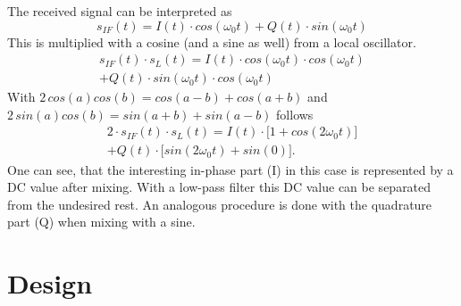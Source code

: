 \documentclass[conference]{IEEEtran}
\begin{document}
The received signal can be interpreted as
\begin{equation}
	s_{IF}(t)=I(t) \cdot cos(\omega_{0}t) + Q(t) \cdot sin(\omega_{0}t)
\end{equation}     
This is multiplied with a cosine (and a sine as well) from a local oscillator.
\begin{multline}
        s_{IF}(t) \cdot s_L(t) = I(t) \cdot cos(\omega_{0}t) \cdot cos(\omega_{0}t)\\+ Q(t) \cdot sin(\omega_{0}t) \cdot cos(\omega_{0}t)
\end{multline}
With \ensuremath{2\,cos(a)cos(b)=cos(a-b)+cos(a+b)} and \ensuremath{2\,sin(a)cos(b)=sin(a+b)+sin(a-b)} follows
\begin{multline}
        2 \cdot s_{IF}(t) \cdot s_L(t) = I(t) \cdot \bigl[1+cos(2\omega_{0}t)\bigr]\\+ Q(t) \cdot \bigl[sin(2\omega_0t)+sin(0)\bigr].
\end{multline}
One can see, that the interesting in-phase part (I) in this case is
represented by a DC value after mixing. With a low-pass filter this DC
value can be separated from the undesired rest. An analogous procedure
is done with the quadrature part (Q) when mixing with a sine.

\section{Design}
\end{document}
